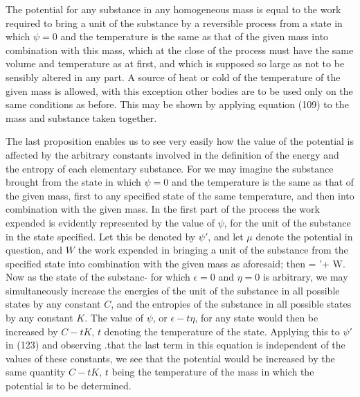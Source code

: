 \documentclass[12pt]{article}
\begin{document}
The potential for any substance in any homogeneous mass is equal to the work required to bring a unit of the substance by a reversible process from a state in which $\psi =0$ and the temperature is the same as that of the given mass into combination with this mass, which at the close of the process must have the same volume and temperature as at first, and which is supposed so large as not to be sensibly altered in any part. A source of heat or cold of the temperature of the given mass is allowed, with this exception other bodies are to be used only on the same conditions as before. This may be shown by applying equation (109) to the mass and substance taken together.


The last proposition enables us to see very easily how the value of the potential is affected by the arbitrary constants involved in the definition of the energy and the entropy of each elementary substance. For we may imagine the substance brought from the state in which $\psi =0$ and the temperature is the same as that of the given mass, first to any specified state of the same temperature, and then into combination with the given mass. In the first part of the process the work expended is evidently represented by the value of $\psi$, for the unit of the substance in the state specified. Let this be denoted by $\psi'$, and let $\mu$ denote the potential in question, and $W$ the work expended in bringing a unit of the substance from the specified state into combination with the given mass as aforesaid; then
\eqs \mu = \psi'+ W. \label{123}\eqe
Now as the state of the substanc- for which $\epsilon =0$ and $\eta = 0$ is arbitrary, we may simultaneously increase the energies of the unit of the substance in all possible states by any constant $C$, and the entropies of the substance in all possible states by any constant $K$. The value of $\psi$, or $\epsilon-t\eta$, for any state would then be increased by $C-tK$, $t$ denoting the temperature of the state. Applying this to $\psi'$ in (123) and observing .that the last term in this equation is independent of the values of these constants, we see that the potential would be increased by the same quantity $C-tK$, $t$ being the temperature of the mass in which the potential is to be determined.

\end{document}
